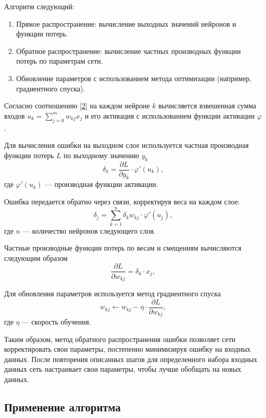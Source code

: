 \documentclass[12pt, a4paper]{article}
\renewcommand{\phi}{\varphi}
\begin{document}
Алгоритм следующий:
\begin{enumerate}
	\item Прямое распространение: вычисление выходных значений нейронов и функции потерь.
	\item Обратное распространение: вычисление частных производных функции потерь по параметрам сети.
	\item Обновление параметров с использованием метода оптимизации (например, градиентного спуска).
\end{enumerate}

Согласно соотношению \eqref{2} на каждом нейроне $k$ вычисляется взвешенная сумма входов $u_k = \sum_{j=0}^{m} w_{kj} x_j$ и его активация с использованием функции активации $\phi$.

Для вычисления ошибки на выходном слое используется частная производная функции потерь $L$ по выходному значению $y_k$
\begin{equation}
	\delta_k = \frac{\partial L}{\partial y_k} \cdot \phi'(u_k),
	\label{7}
\end{equation}
где $\phi'(u_k)$ — производная функции активации.

Ошибка передается обратно через связи, корректируя веса на каждом слое:
\begin{equation}
	\delta_j = \sum_{k=1}^{n} \delta_k w_{kj} \cdot \phi'(u_j),
	\label{8}
\end{equation}
где $n$ — количество нейронов следующего слоя.

Частные производные функции потерь по весам и смещениям вычисляются следующим образом
\begin{equation}
	\frac{\partial L}{\partial w_{kj}} = \delta_k \cdot x_j,
\end{equation}

Для обновления параметров используется метод градиентного спуска\cite[c.23]{10}
\begin{equation}
	w_{kj} \leftarrow w_{kj} - \eta \cdot \frac{\partial L}{\partial w_{kj}},
	\label{11}
\end{equation}
где $\eta$ — скорость обучения.

Таким образом, метод обратного распространения ошибки позволяет сети корректировать свои параметры, постепенно минимизируя ошибку на входных данных. После повторения описанных шагов для определенного набора входных данных сеть настраивает свои параметры, чтобы лучше обобщать на новых данных.

\newpage
\subsection{Применение алгоритма}
\end{document}

